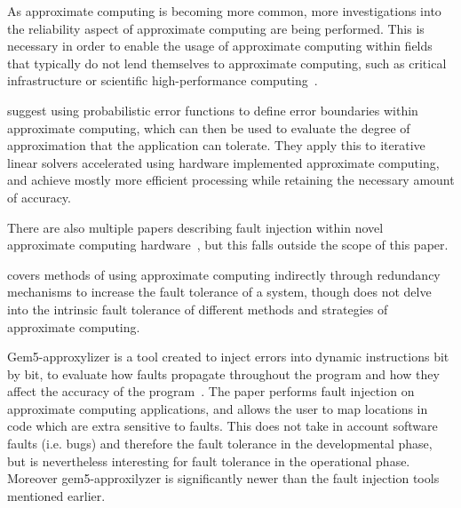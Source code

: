 As approximate computing is becoming more common, more investigations into the reliability aspect of approximate computing are being performed. 
This is necessary in order to enable the usage of approximate computing within fields that typically do not lend themselves to approximate computing, such as critical infrastructure or scientific high-performance computing~\citep{wunderlich2016pushing, rodrigues2018performances}.

\citet{wunderlich2016pushing} suggest using probabilistic error functions to define error boundaries within approximate computing, which can then be used to evaluate the degree of approximation that the application can tolerate. They apply this to iterative linear solvers accelerated using hardware implemented approximate computing, and achieve mostly more efficient processing while retaining the necessary amount of accuracy.  



There are also multiple papers describing fault injection within novel approximate computing hardware~\citep{anghel2018test, aponte2018review}, but this falls outside the scope of this paper. 

\citet{aponte2018review} covers methods of using approximate computing indirectly through redundancy mechanisms to increase the fault tolerance of a system, though does not delve into the intrinsic fault tolerance of different methods and strategies of approximate computing. 

Gem5-approxylizer is a tool created to inject errors 
into dynamic instructions bit by bit, to evaluate how faults propagate throughout the program and how they affect the accuracy of the program~\citep{venkatagiri2019gem5}. The paper performs fault injection on approximate computing applications, and allows the user to map locations in code which are extra sensitive to faults. This does not take in account software faults (i.e. bugs) and therefore the fault tolerance in the developmental phase, but is nevertheless interesting for fault tolerance in the operational phase.  Moreover gem5-approxilyzer is significantly newer than the fault injection tools mentioned earlier. 
 


